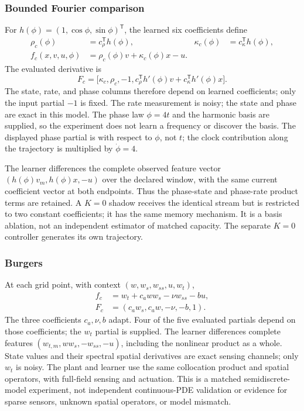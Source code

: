 \subsubsection{Bounded Fourier comparison}
For $h(\phi)=(1,\cos\phi,\sin\phi)^{\mathsf T}$,
the learned six coefficients define
\begin{align}
 \rho_c(\phi)&=c_\rho^{\mathsf T}h(\phi),&
 \kappa_c(\phi)&=c_\kappa^{\mathsf T}h(\phi),\\
 f_c(x,v,u,\phi)&=\rho_c(\phi)v+\kappa_c(\phi)x-u.
\end{align}
The evaluated derivative is
\begin{equation}
 F_c=\bigl[\kappa_c,\rho_c,-1,
 c_\rho^{\mathsf T}h'(\phi)v+c_\kappa^{\mathsf T}h'(\phi)x\bigr].
 \label{eq:audit_fourier_partials}
\end{equation}
The state, rate, and phase columns therefore depend on learned coefficients;
only the input partial $-1$ is fixed. The rate measurement is noisy; the
state and phase are exact in this model. The phase law $\phi=4t$ and the
harmonic basis are supplied, so the experiment does not learn a frequency
or discover the basis. The displayed phase partial is with respect to
$\phi$, not $t$; the clock contribution along the trajectory is multiplied
by $\dot\phi=4$.

The learner differences the complete observed feature vector
$(h(\phi)v_m,h(\phi)x,-u)$ over the declared window, with the same current
coefficient vector at both endpoints. Thus the phase-state and phase-rate
product terms are retained. A $K=0$ shadow receives the identical stream
but is restricted to two constant coefficients; it has the same memory
mechanism. It is a basis ablation, not an independent estimator of matched
capacity. The separate $K=0$ controller generates its own trajectory.

\subsubsection{Burgers}
At each grid point, with context $(w,w_s,w_{ss},u,w_t)$,
\begin{align}
 f_c&=w_t+c_a w w_s-\nu w_{ss}-bu,\\
 F_c&=(c_a w_s,c_a w,-\nu,-b,1).
 \label{eq:audit_burgers_partials}
\end{align}
The three coefficients $c_a,\nu,b$ adapt. Four of the five evaluated
partials depend on those coefficients; the $w_t$ partial is supplied.
The learner differences complete features $(w_{t,m},ww_s,-w_{ss},-u)$,
including the nonlinear product as a whole. State values and their
spectral spatial derivatives are exact sensing channels; only $w_t$ is
noisy. The plant and learner use the same collocation product and spatial
operators, with full-field sensing and actuation. This is a matched
semidiscrete-model experiment, not independent continuous-PDE validation
or evidence for sparse sensors, unknown spatial operators, or model mismatch.

